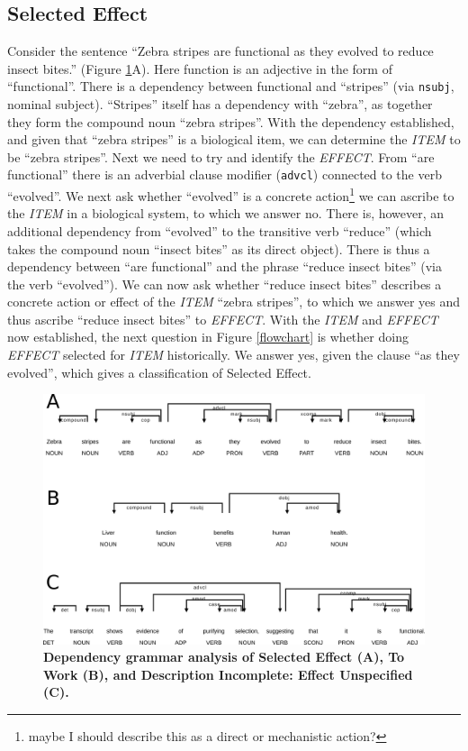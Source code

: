 \documentclass{article}
\begin{document}
\subsection{Selected Effect}
\label{sec:selected-effect}

Consider the sentence ``Zebra stripes are functional as they evolved to reduce insect bites.'' (Figure \ref{seleff_towork_effunsp}A).
Here function is an adjective in the form of ``functional''.
There is a dependency between functional and ``stripes'' (via \texttt{nsubj}, nominal subject).
``Stripes'' itself has a dependency with ``zebra'', as together they form the compound noun ``zebra stripes''.
With the dependency established, and given that ``zebra stripes'' is a biological item, we can determine the \emph{ITEM} to be ``zebra stripes''.
Next we need to try and identify the \emph{EFFECT}.
From ``are functional'' there is an adverbial clause modifier (\texttt{advcl}) connected to the verb ``evolved''.
We next ask whether ``evolved'' is a concrete action\footnote{maybe I should describe this as a direct or mechanistic action?} we can ascribe to the \emph{ITEM} in a biological system, to which we answer no.
There is, however, an additional dependency from ``evolved'' to the transitive verb ``reduce'' (which takes the compound noun ``insect bites'' as its direct object).
There is thus a dependency between ``are functional'' and the phrase ``reduce insect bites'' (via the verb ``evolved'').
We can now ask whether ``reduce insect bites'' describes a concrete action or effect of the \emph{ITEM} ``zebra stripes'', to which we answer yes and thus ascribe ``reduce insect bites'' to \emph{EFFECT}.
With the \emph{ITEM} and \emph{EFFECT} now established, the next question in Figure \ref{flowchart} is whether doing \emph{EFFECT} selected for \emph{ITEM} historically.
We answer yes, given the clause ``as they evolved'', which gives a classification of Selected Effect.


\begin{figure}[ht]
  \centering
  \includegraphics[width=\linewidth]{combined_seleff_towork_effunsp.png}
  \caption[]{\textbf{Dependency grammar analysis of Selected Effect (A), To Work (B), and Description Incomplete: Effect Unspecified (C).}}
  \label{seleff_towork_effunsp}
\end{figure}
\end{document}
